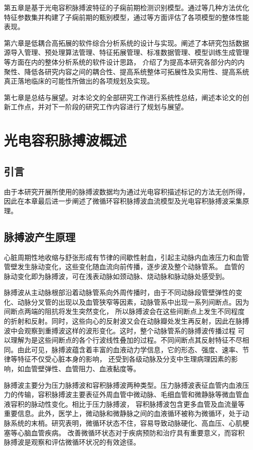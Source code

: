 第五章是基于光电容积脉搏波特征的子痫前期检测识别模型。通过等几种方法优化特征参数集并构建了子痫前期的甄别模型，通过等方面评估了各项模型的整体性能表现。

第六章是低耦合高拓展的软件综合分析系统的设计与实现。阐述了本研究包括数据源导入管理、预处理算法管理、特征拓展管理、标准数据管理、模型训练生成管理等方面在内的整体分析系统的软件设计思路，
介绍了为提高本研究各部分内的内聚性、降低各研究内容之间的耦合性、提高系统整体可拓展性及实用性、提高系统真正落地临床的可能性所做出的各项规划及实现。

第七章是总结与展望。对本论文的全部研究工作进行系统性总结，阐述本论文的创新工作点，并对下一阶段的研究工作内容进行了规划与展望。

\chapter{光电容积脉搏波概述}
\section{引言}
由于本研究开展所使用的脉搏波数据均为通过光电容积描述标记的方法无创所得，因此在本章最后进一步阐述了微循环容积脉搏波血流模型及光电容积脉搏波采集原理。
\section{脉搏波产生原理}
心脏周期性地收缩与舒张形成有节律的间歇性射血，引起主动脉内血液压力和血管管壁发生脉动变化，这些变化随血流向前传播，逐步波及整个动脉管系。
血管的脉动变化即为脉搏波，可在浅表动脉如颈动脉、烧动脉和脉动脉处感受到。

脉搏波从主动脉根部沿着动脉管系向外周传播时，由于不同动脉段管壁弹性的变化、动脉分叉管的出现以及血管狭窄等因素，动脉管系中出现一系列间断点。因为间断点两端的阻抗将发生突然变化，
所以脉搏波会在这些间断点上发生不同程度的折射和反射。同时，这些向心的反射波又会在动脉瓣处发生再反射，因此在脉搏波中会观察到重搏波这样的波形变化。这时，整个动脉管系的脉搏波传播过程
可以理解为是这些间断点的各个行波线性叠加的过程。不同间断点其反射特征不尽相同。由此可见，脉搏波蕴含着丰富的血液动力学信息，它的形态、强度、速率、节律等特征不仅受心脏本身的影响，
还受到各级动脉及分支中生理病理因素的影响，如血管壁弹性、血管阻力、血液黏度等。

脉搏波主要分为压力脉搏波和容积脉搏波两种类型。压力脉搏波表征血管内血液压力的传输，容积脉搏波主要表征外周血管中微动脉、毛细血管和微静脉等微血管血液容积的脉动性变化。相比于压力脉搏波，
容积脉搏波包含更多血管及血流量等重要信息。此外，医学上，微动脉和微静脉之间的血液循环被称为微循环，处于动脉系统的末梢。研究表明，微循环状态不住，容易导致动脉硬化、高血压、心肌梗塞等心脑血管疾病。
改善微循环状态对于疾病预防和治疗具有重要意义，而容积脉搏波是观察和评估微循环状况的有效途径。

